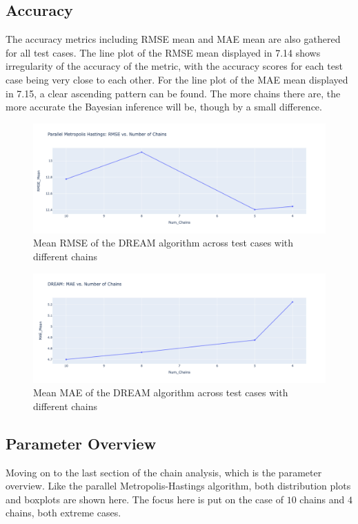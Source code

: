 \subsection{Accuracy}
The accuracy metrics including RMSE mean and MAE mean are also gathered for all test cases. The line plot of the RMSE mean displayed in 7.14 shows irregularity of the accuracy of the metric, with the accuracy scores for each test case being very close to each other. For the line plot of the MAE mean displayed in 7.15, a clear ascending pattern can be found. The more chains there are, the more accurate the Bayesian inference will be, though by a small difference.
\begin{figure}[H]
    \centering
    \includegraphics[width=1\textwidth]{figures/dream/rmse.png}
    \captionsetup{width=.8\textwidth}
    \caption{Mean RMSE of the DREAM algorithm across test cases with different chains}
    \label{fig:enter-label}
\end{figure}

\begin{figure}[H]
    \centering
    \includegraphics[width=1\textwidth]{figures/dream/mae.png}
    \captionsetup{width=.8\textwidth}
    \caption{Mean MAE of the DREAM algorithm across test cases with different chains}
    \label{fig:enter-label}
\end{figure}

\subsection{Parameter Overview}
Moving on to the last section of the chain analysis, which is the parameter overview. Like the parallel Metropolis-Hastings algorithm, both distribution plots and boxplots are shown here. The focus here is put on the case of $10$ chains and $4$ chains, both extreme cases. 

